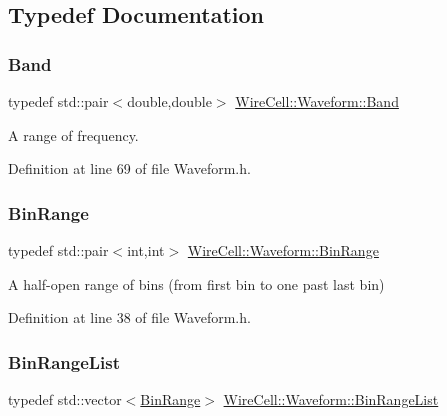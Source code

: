 \subsection{Typedef Documentation}
\mbox{\label{namespace_wire_cell_1_1_waveform_ab27ab5a1dc3d0ee2fb297a094e725662}} 
\subsubsection{\texorpdfstring{Band}{Band}}
{\footnotesize\ttfamily typedef std\+::pair$<$double,double$>$ \hyperlink{namespace_wire_cell_1_1_waveform_ab27ab5a1dc3d0ee2fb297a094e725662}{Wire\+Cell\+::\+Waveform\+::\+Band}}



A range of frequency. 



Definition at line 69 of file Waveform.\+h.

\mbox{\label{namespace_wire_cell_1_1_waveform_accc2021da53792e30eb4f0335b630811}} 
\subsubsection{\texorpdfstring{Bin\+Range}{BinRange}}
{\footnotesize\ttfamily typedef std\+::pair$<$int,int$>$ \hyperlink{namespace_wire_cell_1_1_waveform_accc2021da53792e30eb4f0335b630811}{Wire\+Cell\+::\+Waveform\+::\+Bin\+Range}}



A half-\/open range of bins (from first bin to one past last bin) 



Definition at line 38 of file Waveform.\+h.

\mbox{\label{namespace_wire_cell_1_1_waveform_ae9e850f13cd7f9cbcc309a5d7dd2fd37}} 
\subsubsection{\texorpdfstring{Bin\+Range\+List}{BinRangeList}}
{\footnotesize\ttfamily typedef std\+::vector$<$\hyperlink{namespace_wire_cell_1_1_waveform_accc2021da53792e30eb4f0335b630811}{Bin\+Range}$>$ \hyperlink{namespace_wire_cell_1_1_waveform_ae9e850f13cd7f9cbcc309a5d7dd2fd37}{Wire\+Cell\+::\+Waveform\+::\+Bin\+Range\+List}}



